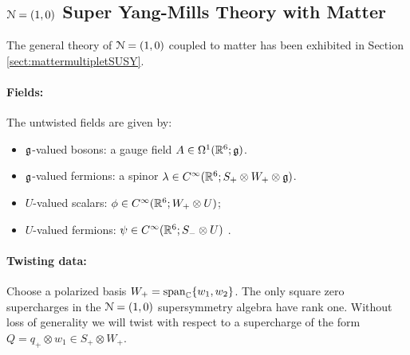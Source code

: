 \documentclass[10pt, oneside]{article}
\begin{document}
\subsection{$\mathcal{N} = (1,0)$ Super Yang-Mills Theory with Matter} \label{6d_10_section}

The general theory of $\mathcal{N} = (1,0)$ coupled to matter has been exhibited in Section \ref{sect:mattermultipletSUSY}. 

\vspace{-10pt}
\paragraph{Fields:}
The untwisted fields are given by:
\begin{itemize}
\item $\mathfrak g$-valued bosons: a gauge field $A \in \Omega^1(\mathbb R^6;\mathfrak g)$.
\item $\mathfrak g$-valued fermions: a spinor $\lambda \in C^\infty(\mathbb R^6 ; S_+ \otimes W_+ \otimes \mathfrak g)$. 
\item $U$-valued scalars: $\phi \in C^\infty(\mathbb R^6 ; W_+ \otimes U)$;
\item $U$-valued fermions: $\psi \in C^\infty(\mathbb R^6 ; S_- \otimes U)$ .
\end{itemize}

\vspace{-10pt}
\paragraph{Twisting data:}
Choose a polarized basis $W_+ = {\rm span}_{\mathbb C}\{w_1, w_2\}$.
The only square zero supercharges in the $\mathcal{N}=(1,0)$ supersymmetry algebra have rank one.  Without loss of generality we will twist with respect to a supercharge of the form $Q = q_+ \otimes w_1 \in S_+ \otimes W_+$. 
\end{document}
